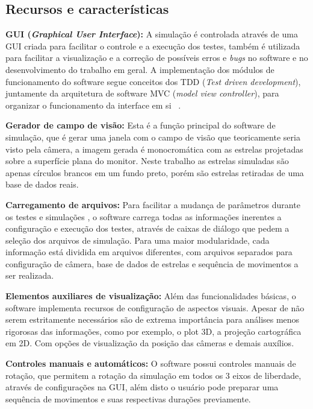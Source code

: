 \subsection{Recursos e características}

\textbf{GUI (\textit{Graphical User Interface}):} A simulação é controlada através de uma GUI criada para facilitar o controle e a execução dos testes, também é utilizada para facilitar a visualização e a correção de possíveis erros e \textit{bugs} no software e no desenvolvimento do trabalho em geral. 
A implementação dos módulos de funcionamento do software segue conceitos dos TDD (\textit{Test driven  development}), 
juntamente da arquitetura de software MVC (\textit{model view controller}), 
para organizar o funcionamento da interface em si ~\cite[]{Martin_Fitzpatrick}.

\textbf{Gerador de campo de visão:} Esta é a função principal do software de simulação, 
que é gerar uma janela com o campo de visão que teoricamente seria visto pela câmera, 
a imagem gerada é monocromática com as estrelas projetadas sobre a superfície plana do monitor. 
Neste trabalho as estrelas simuladas são apenas círculos brancos em um fundo preto, porém são estrelas retiradas de uma base de dados reais.

\textbf{Carregamento de arquivos:} Para facilitar a mudança de parâmetros durante os testes e simulações , o software carrega todas as informações inerentes a configuração e execução dos testes, através de caixas de diálogo que pedem a seleção dos arquivos de simulação. Para uma maior modularidade, cada informação está dividida em arquivos diferentes, com arquivos separados para configuração de câmera, base de dados de estrelas e sequência de movimentos a ser realizada.

\textbf{Elementos auxiliares de visualização:} Além das funcionalidades básicas, o software implementa  recursos de configuração  de aspectos visuais. Apesar de não serem estritamente necessários são de extrema importância  para análises menos rigorosas das informações, como por exemplo, o plot 3D, a projeção cartográfica em 2D. Com opções de visualização da posição das câmeras e demais auxílios.

\textbf{Controles manuais e automáticos:} O software possui controles manuais de rotação, que permitem a rotação da simulação em todos os 3 eixos de liberdade, através de configurações na GUI, além disto o usuário pode preparar uma sequência de movimentos e suas respectivas durações previamente.

